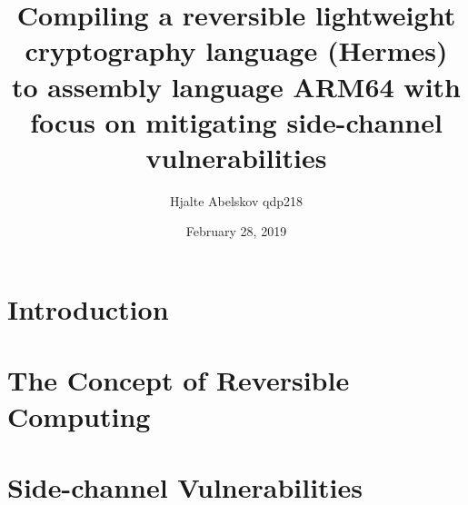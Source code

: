 \documentclass[a4paper,10pt,openright]{memoir}
\title{Compiling a reversible lightweight cryptography language (Hermes) to assembly language ARM64 with focus on mitigating side-channel vulnerabilities}
\author{Hjalte Abelskov qdp218}
\date{February 28, 2019} %
\begin{document}
\maketitle
{}
\setcounter{page}{3}

\cleardoublepage
\pagestyle{plain}
\begin{abstract}

\end{abstract}

\clearpage
\begin{resume}

\end{resume}

\setcounter{tocdepth}{2} %
\cleardoublepage
{}
\tableofcontents*

\cleardoublepage
{}
\setcounter{page}{1}

\chapter{Introduction}




\chapter{The Concept of Reversible Computing}
\label{chapt - Concept of reversible computing}





\chapter{Side-channel Vulnerabilities}
\label{chapt - Side-channel}



\end{document}
